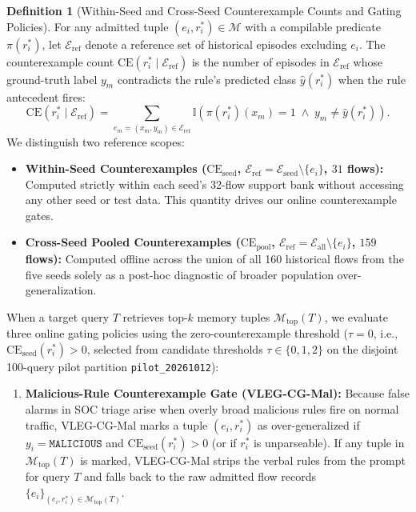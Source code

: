 \documentclass[10pt,a4paper,onecolumn]{article}
\theoremstyle{definition}
\newtheorem{definition}{Definition}
\theoremstyle{remark}
\begin{document}
\begin{definition}[Within-Seed and Cross-Seed Counterexample Counts and Gating Policies]
For any admitted tuple $(e_i, r_i^*) \in \mathcal{M}$ with a compilable predicate $\pi(r_i^*)$, let $\mathcal{E}_{\mathrm{ref}}$ denote a reference set of historical episodes excluding $e_i$. The counterexample count $\mathrm{CE}(r_i^* \mid \mathcal{E}_{\mathrm{ref}})$ is the number of episodes in $\mathcal{E}_{\mathrm{ref}}$ whose ground-truth label $y_m$ contradicts the rule's predicted class $\hat{y}(r_i^*)$ when the rule antecedent fires:
\begin{equation}
    \mathrm{CE}(r_i^* \mid \mathcal{E}_{\mathrm{ref}}) = \sum_{e_m = (x_m, y_m) \in \mathcal{E}_{\mathrm{ref}}} \mathbb{I}\!\left(\pi(r_i^*)(x_m) = 1 \;\wedge\; y_m \neq \hat{y}(r_i^*)\right).
    \label{eq:ce_count}
\end{equation}
We distinguish two reference scopes:
\begin{itemize}[leftmargin=1.8em]
    \item \textbf{Within-Seed Counterexamples ($\mathrm{CE}_{\mathrm{seed}}$, $\mathcal{E}_{\mathrm{ref}} = \mathcal{E}_{\mathrm{seed}} \setminus \{e_i\}$, $31$ flows):} Computed strictly within each seed's 32-flow support bank without accessing any other seed or test data. This quantity drives our online counterexample gates.
    \item \textbf{Cross-Seed Pooled Counterexamples ($\mathrm{CE}_{\mathrm{pool}}$, $\mathcal{E}_{\mathrm{ref}} = \mathcal{E}_{\mathrm{all}} \setminus \{e_i\}$, $159$ flows):} Computed offline across the union of all 160 historical flows from the five seeds solely as a post-hoc diagnostic of broader population over-generalization.
\end{itemize}
When a target query $T$ retrieves top-$k$ memory tuples $\mathcal{M}_{\mathrm{top}}(T)$, we evaluate three online gating policies using the zero-counterexample threshold ($\tau = 0$, i.e., $\mathrm{CE}_{\mathrm{seed}}(r_i^*) > 0$, selected from candidate thresholds $\tau \in \{0, 1, 2\}$ on the disjoint 100-query pilot partition \texttt{pilot\_20261012}):
\begin{enumerate}[leftmargin=1.8em]
    \item \textbf{Malicious-Rule Counterexample Gate (VLEG-CG-Mal):} Because false alarms in SOC triage arise when overly broad malicious rules fire on normal traffic, VLEG-CG-Mal marks a tuple $(e_i, r_i^*)$ as over-generalized if $y_i = \texttt{MALICIOUS}$ and $\mathrm{CE}_{\mathrm{seed}}(r_i^*) > 0$ (or if $r_i^*$ is unparseable). If any tuple in $\mathcal{M}_{\mathrm{top}}(T)$ is marked, VLEG-CG-Mal strips the verbal rules from the prompt for query $T$ and falls back to the raw admitted flow records $\{e_i\}_{(e_i,r_i^*)\in\mathcal{M}_{\mathrm{top}}(T)}$.

\end{enumerate}
\end{definition}
\end{document}
